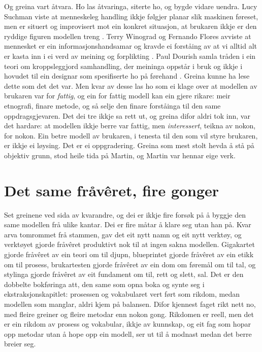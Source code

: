 Og greina vart åtvara. Ho las åtvaringa, siterte ho, og bygde vidare uendra. Lucy Suchman viste at menneskeleg handling ikkje følgjer planar slik maskinen føreset, men er situert og improvisert mot ein konkret situasjon, at brukaren ikkje er den ryddige figuren modellen treng \autocite{suchman1987}. Terry Winograd og Fernando Flores avviste at mennesket er ein informasjonshandsamar og kravde ei forståing av at vi alltid alt er kasta inn i ei verd av meining og forplikting \autocite{winograd1986}. Paul Dourish samla tråden i ein teori om kroppsleggjord samhandling, der meininga oppstår i bruk og ikkje i hovudet til ein designar som spesifiserte ho på førehand \autocite{dourish2001}. Greina kunne ha lese dette som det det var. Men kvar av desse las ho som ei klage over at modellen av brukaren var for \emph{fattig}, og ein for fattig modell kan ein gjere rikare: meir etnografi, finare metode, og så selje den finare forståinga til den same oppdragsgjevaren. Det dei tre ikkje sa rett ut, og greina difor aldri tok inn, var det hardare: at modellen ikkje berre var fattig, men \emph{interessert}, teikna av nokon, for nokon. Ein betre modell av brukaren, i tenesta til den som vil styre brukaren, er ikkje ei løysing. Det er ei oppgradering. Greina som mest stolt hevda å stå på objektiv grunn, stod heile tida på Martin, og Martin var hennar eige verk.

\section{Det same fråvêret, fire gonger}

Set greinene ved sida av kvarandre, og dei er ikkje fire forsøk på å byggje den same modellen frå ulike kantar. Dei er fire måtar å klare seg utan han på. Kvar arva tomrommet frå stammen, gav det eit nytt namn og eit nytt verktøy, og verktøyet gjorde fråvêret produktivt nok til at ingen sakna modellen. Gigakartet gjorde fråvêret av ein teori om til djupn, blueprintet gjorde fråvêret av ein etikk om til prosess, brukartesten gjorde fråvêret av ein dom om føremål om til tal, og stylinga gjorde fråvêret av eit fundament om til, rett og slett, sal. Det er den dobbelte bokføringa att, den same som opna boka og synte seg i ekstraksjonskapitlet: prosessen og vokabularet vert ført som rikdom, medan modellen som manglar, aldri kjem på balansen. Difor kjennest faget rikt nett no, med fleire greiner og fleire metodar enn nokon gong. Rikdomen er reell, men det er ein rikdom av prosess og vokabular, ikkje av kunnskap, og eit fag som hopar opp metodar utan å hope opp ein modell, ser ut til å modnast medan det berre breier seg.

